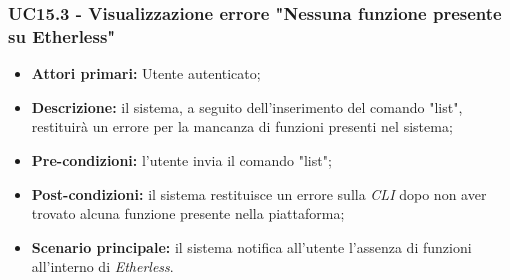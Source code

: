 \subsubsection{UC15.3 - Visualizzazione errore "Nessuna funzione presente su Etherless\glos"}
\begin{itemize}
	\item \textbf{Attori primari:} Utente autenticato;
	\item \textbf{Descrizione:} il sistema, a seguito dell'inserimento del comando "list", restituirà un errore per la mancanza di funzioni presenti nel sistema;
	\item \textbf{Pre-condizioni:} l'utente invia il comando "list";
	\item \textbf{Post-condizioni:} il sistema restituisce un errore sulla \textit{CLI\glo} dopo non aver trovato alcuna funzione presente nella piattaforma;
	\item \textbf{Scenario principale:} il sistema notifica all'utente l'assenza di funzioni all'interno di \textit{Etherless\glos}.
\end{itemize}

